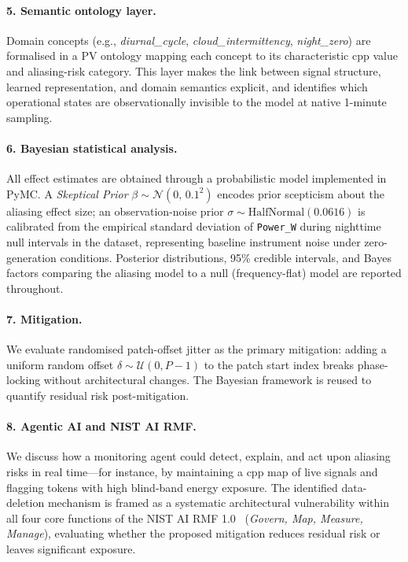 \documentclass[11pt,a4paper]{article}
\begin{document}
\paragraph{5. Semantic ontology layer.}
Domain concepts (e.g., \textit{diurnal\_cycle}, \textit{cloud\_intermittency}, \textit{night\_zero}) are formalised in a PV ontology mapping each concept to its characteristic cpp value and aliasing-risk category. This layer makes the link between signal structure, learned representation, and domain semantics explicit, and identifies which operational states are observationally invisible to the model at native 1-minute sampling.

\paragraph{6. Bayesian statistical analysis.}
All effect estimates are obtained through a probabilistic model implemented in PyMC. A \textit{Skeptical Prior} $\beta\sim\mathcal{N}(0,\,0.1^2)$ encodes prior scepticism about the aliasing effect size; an observation-noise prior $\sigma\sim\mathrm{HalfNormal}(0.0616)$ is calibrated from the empirical standard deviation of \texttt{Power\_W} during nighttime null intervals in the dataset, representing baseline instrument noise under zero-generation conditions. Posterior distributions, 95\% credible intervals, and Bayes factors comparing the aliasing model to a null (frequency-flat) model are reported throughout.

\paragraph{7. Mitigation.}
We evaluate randomised patch-offset jitter as the primary mitigation: adding a uniform random offset $\delta\sim\mathcal{U}(0,P-1)$ to the patch start index breaks phase-locking without architectural changes. The Bayesian framework is reused to quantify residual risk post-mitigation.

\paragraph{8. Agentic AI and NIST AI RMF.}
We discuss how a monitoring agent could detect, explain, and act upon aliasing risks in real time---for instance, by maintaining a cpp map of live signals and flagging tokens with high blind-band energy exposure. The identified data-deletion mechanism is framed as a systematic architectural vulnerability within all four core functions of the NIST AI RMF 1.0~\cite{nist2023} (\textit{Govern, Map, Measure, Manage}), evaluating whether the proposed mitigation reduces residual risk or leaves significant exposure.
\end{document}
